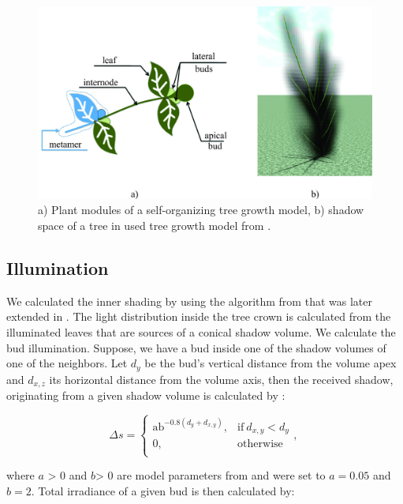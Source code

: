 \documentclass[1p]{elsarticle}
\begin{document}
\begin{figure}
    \centering
    \includegraphics[width=4.5in]{figs/image1.jpg}
    \caption{a) Plant modules of a self-organizing tree growth
model, b) shadow space of a tree in used tree growth model from \cite{kohek_eduapple:_2015}.}
    \label{fig:my_label}
\end{figure}


\subsection{Illumination}

We calculated the inner shading by using the algorithm from \cite{palubicki_self-organizing_2009}
that was later extended in \cite{strnad_novel_2017,pirk_plastic_2012,stava_inverse_2014}. The light distribution
inside the tree crown is calculated from the illuminated leaves that are
sources of a conical shadow volume. We calculate the bud illumination.
Suppose, we have a bud inside one of the shadow volumes of one of the
neighbors. Let \(d_{y}\) be the bud's vertical distance from the volume
apex and \(d_{x,z}\) its horizontal distance from the volume axis, then
the received shadow, originating from a given shadow volume is
calculated by \cite{strnad_novel_2017}:

\begin{equation}
\Delta s = \left\{ \begin{matrix}
\text{ab}^{- 0.8\left( d_{y} + d_{x,y} \right)}, & \mathrm{\text{if}}\ d_{x,y} < d_{y} \\
0, & \mathrm{otherwise} \\
\end{matrix}, \right.\    
\end{equation}

where \(a\) \textgreater{} 0 and \(b\)\textgreater{} 0 are model
parameters from \cite{palubicki_self-organizing_2009} and were set to \(a = 0.05\) and \(b = 2\).
Total irradiance of a given bud is then calculated by:
\end{document}
